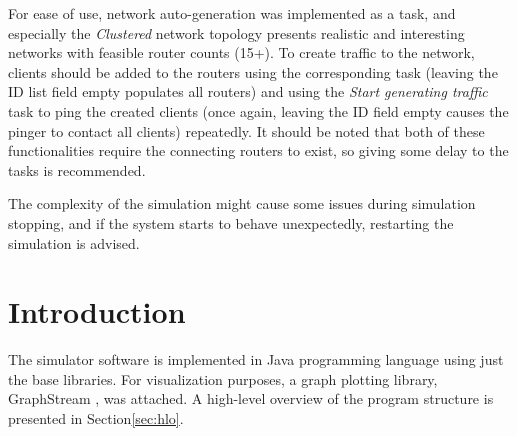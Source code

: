 \documentclass[11pt,a4paper,titlepage]{report}
\begin{document}
For ease of use, network auto-generation was implemented as a task, and especially the \emph{Clustered} network topology presents realistic and interesting networks with feasible router counts (15+). To create traffic to the network, clients should be added to the routers using the corresponding task (leaving the ID list field empty populates all routers) and using the \emph{Start generating traffic} task to ping the created clients (once again, leaving the ID field empty causes the pinger to contact all clients) repeatedly. It should be noted that both of these functionalities require the connecting routers to exist, so giving some delay to the tasks is recommended.

The complexity of the simulation might cause some issues during simulation stopping, and if the system starts to behave unexpectedly, restarting the simulation is advised.

\section{Introduction}\label{sec:intro}
The simulator software is implemented in Java programming language using just the base libraries. For visualization purposes, a graph plotting library, GraphStream \cite{graphstreamteam2017}, was attached. A high-level overview of the program structure is presented in Section\ref{sec:hlo}.
\end{document}

